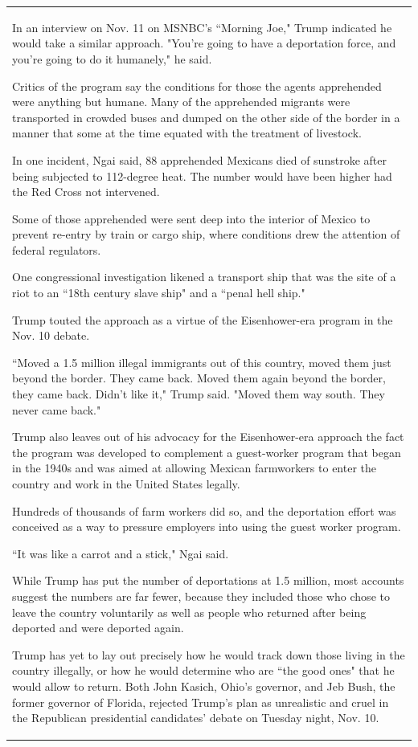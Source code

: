 \begin{table}
\begin{center}
\begin{tabular}{|L{14.7cm}|}
In an interview on Nov. 11 on MSNBC's ``Morning Joe," Trump indicated he would take a similar approach. "You're going to have a deportation force, and you're going to do it humanely," he said.

Critics of the program say the conditions for those the agents apprehended were anything but humane. Many of the apprehended migrants were transported in crowded buses and dumped on the other side of the border in a manner that some at the time equated with the treatment of livestock.

In one incident, Ngai said, 88 apprehended Mexicans died of sunstroke after being subjected to 112-degree heat. The number would have been higher had the Red Cross not intervened.

Some of those apprehended were sent deep into the interior of Mexico to prevent re-entry by train or cargo ship, where conditions drew the attention of federal regulators.

One congressional investigation likened a transport ship that was the site of a riot to an ``18th century slave ship" and a ``penal hell ship."

Trump touted the approach as a virtue of the Eisenhower-era program in the Nov. 10 debate.

``Moved a 1.5 million illegal immigrants out of this country, moved them just beyond the border. They came back. Moved them again beyond the border, they came back. Didn't like it," Trump said. "Moved them way south. They never came back."

Trump also leaves out of his advocacy for the Eisenhower-era approach the fact the program was developed to complement a guest-worker program that began in the 1940s and was aimed at allowing Mexican farmworkers to enter the country and work in the United States legally.

Hundreds of thousands of farm workers did so, and the deportation effort was conceived as a way to pressure employers into using the guest worker program.

``It was like a carrot and a stick," Ngai said.

While Trump has put the number of deportations at 1.5 million, most accounts suggest the numbers are far fewer, because they included those who chose to leave the country voluntarily as well as people who returned after being deported and were deported again.

Trump has yet to lay out precisely how he would track down those living in the country illegally, or how he would determine who are ``the good ones" that he would allow to return. Both John Kasich, Ohio's governor, and Jeb Bush, the former governor of Florida, rejected Trump's plan as unrealistic and cruel in the Republican presidential candidates' debate on Tuesday night, Nov. 10.


\end{tabular}
\end{center}
\end{table}
